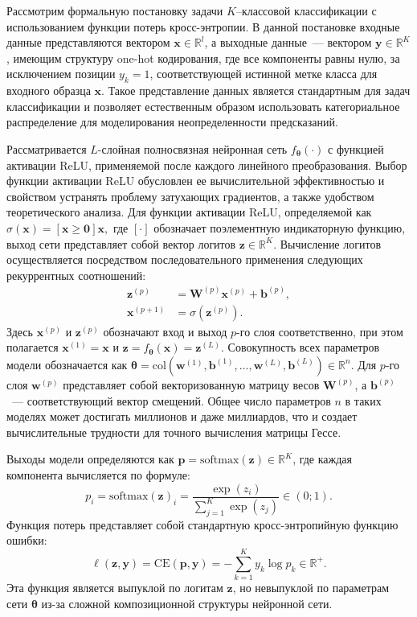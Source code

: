 Рассмотрим формальную постановку задачи $K$--классовой классификации с использованием функции потерь кросс-энтропии.
В данной постановке входные данные представляются вектором $\mathbf{x} \in \mathbb{R}^{l}$, а выходные данные~--- вектором $\mathbf{y} \in \mathbb{R}^{K}$, имеющим структуру one-hot кодирования, где все компоненты равны нулю, за исключением позиции $y_k = 1$, соответствующей истинной метке класса для входного образца $\mathbf{x}$.
Такое представление данных является стандартным для задач классификации и позволяет естественным образом использовать категориальное распределение для моделирования неопределенности предсказаний.

Рассматривается $L$-слойная полносвязная нейронная сеть $f_{\boldsymbol{\theta}}(\cdot)$ с функцией активации ReLU, применяемой после каждого линейного преобразования.
Выбор функции активации ReLU обусловлен ее вычислительной эффективностью и свойством устранять проблему затухающих градиентов, а также удобством теоретического анализа.
Для функции активации ReLU, определяемой как $\sigma(\mathbf{x}) = \left[ \mathbf{x} \geqslant\mathbf{0} \right] \mathbf{x},$ где $[\cdot]$ обозначает поэлементную индикаторную функцию, выход сети представляет собой вектор логитов $\mathbf{z} \in \mathbb{R}^{K}$.
Вычисление логитов осуществляется посредством последовательного применения следующих рекуррентных соотношений:
\begin{align}
    \mathbf{z}^{(p)} &= \mathbf{W}^{(p)} \mathbf{x}^{(p)} + \mathbf{b}^{(p)}, \\
    \mathbf{x}^{(p+1)} &= \sigma(\mathbf{z}^{(p)}).
\end{align}
Здесь $\mathbf{x}^{(p)}$ и $\mathbf{z}^{(p)}$ обозначают вход и выход $p$-го слоя соответственно, при этом полагается $\mathbf{x}^{(1)} = \mathbf{x}$ и $\mathbf{z} = f_{\boldsymbol{\theta}}(\mathbf{x}) = \mathbf{z}^{(L)}$. 
Совокупность всех параметров модели обозначается как $\boldsymbol{\theta} = \mathrm{col}(\mathbf{w}^{(1)}, \mathbf{b}^{(1)}, \ldots, \mathbf{w}^{(L)}, \mathbf{b}^{(L)}) \in \mathbb{R}^{n}$. Для $p$-го слоя $\mathbf{w}^{(p)}$ представляет собой векторизованную матрицу весов $\mathbf{W}^{(p)}$, а $\mathbf{b}^{(p)}$~--- соответствующий вектор смещений.
Общее число параметров $n$ в таких моделях может достигать миллионов и даже миллиардов, что и создает вычислительные трудности для точного вычисления матрицы Гессе.

Выходы модели определяются как $\mathbf{p} = \mathrm{softmax}(\mathbf{z}) \in \mathbb{R}^{K}$, где каждая компонента вычисляется по формуле:
\[
    p_i = \mathrm{softmax}(\mathbf{z})_i = \dfrac{\exp{(z_i)}}{\sum_{j=1}^{K} \exp{(z_j)}} \in (0; 1).
\] 
Функция потерь представляет собой стандартную кросс-энтропийную функцию ошибки:
\[
    \ell(\mathbf{z}, \mathbf{y}) = \mathrm{CE}(\mathbf{p}, \mathbf{y}) = - \sum_{k=1}^{K} y_k \log p_k \in \mathbb{R}^{+}.
\]
Эта функция является выпуклой по логитам $\mathbf{z}$, но невыпуклой по параметрам сети $\boldsymbol{\theta}$ из-за сложной композиционной структуры нейронной сети.

